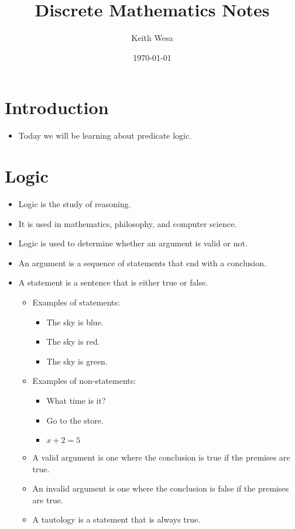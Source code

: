 \documentclass{article}
\title{Discrete Mathematics Notes}
\author{Keith Wesa}
\date{\today}
\begin{document}
\maketitle

\section{Introduction}
\begin{itemize}
    \item Today we will be learning about predicate logic.
\end{itemize}
\section{Logic}
\begin{itemize}
    \item Logic is the study of reasoning.
    \item It is used in mathematics, philosophy, and computer science.
    \item Logic is used to determine whether an argument is valid or not.
    \item An argument is a sequence of statements that end with a conclusion.
    \item A statement is a sentence that is either true or false.
    \begin{itemize}
        \item Examples of statements:
        \begin{itemize}
            \item The sky is blue.
            \item The sky is red.
            \item The sky is green.
        \end{itemize}
        \item Examples of non-statements:
        \begin{itemize}
            \item What time is it?
            \item Go to the store.
            \item $x + 2 = 5$
        \end{itemize}
    \item A valid argument is one where the conclusion is true if the premises are true.
    \item An invalid argument is one where the conclusion is false if the premises are true.
    \item A tautology is a statement that is always true.

\end{itemize}
\end{itemize}
\end{document}
